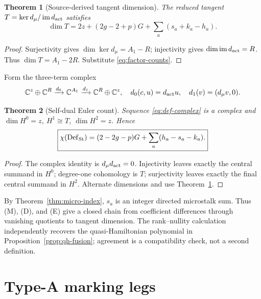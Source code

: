 \documentclass[11pt,a4paper]{amsart}
\theoremstyle{plain}
\newtheorem{theorem}{Theorem}[section]
\theoremstyle{definition}
\newcommand{\CC}{\mathbb C}
\newcommand{\im}{\operatorname{im}}
\newcommand{\Def}{\operatorname{Def}}
\begin{document}
\begin{theorem}[Source-derived tangent dimension]\label{thm:tangent}
The reduced tangent $T=\ker d_\mu/\im d_{\rm act}$ satisfies
\begin{equation}\label{eq:tangent}
 \boxed{\dim T=2z+(2g-2+p)G+\sum_a(s_a+k_a-h_a).}
\end{equation}
\end{theorem}

\begin{proof}
Surjectivity gives $\dim\ker d_\mu=A_1-R$; injectivity gives
$\dim\im d_{\rm act}=R$.  Thus $\dim T=A_1-2R$.  Substitute \eqref{eq:factor-counts}.
\end{proof}

Form the three-term complex
\begin{equation}\label{eq:def-complex}
 \CC^z\oplus\CC^R\xrightarrow{d_0}\CC^{A_1}
 \xrightarrow{d_1}\CC^R\oplus\CC^z,
 \quad d_0(c,u)=d_{\rm act}u,\quad d_1(v)=(d_\mu v,0).
\end{equation}

\begin{theorem}[Self-dual Euler count]\label{thm:euler-count}
Sequence \eqref{eq:def-complex} is a complex and
$\dim H^0=z$, $H^1\cong T$, $\dim H^2=z$.  Hence
\begin{equation}\label{eq:euler-count}
 \boxed{\chi(\Def_{\rm St})=(2-2g-p)G+\sum_a(h_a-s_a-k_a).}
\end{equation}
\end{theorem}

\begin{proof}
The complex identity is $d_\mu d_{\rm act}=0$.  Injectivity leaves exactly the central summand in
$H^0$; degree-one cohomology is $T$; surjectivity leaves exactly the final central summand in
$H^2$.  Alternate dimensions and use Theorem~\ref{thm:tangent}.
\end{proof}

By Theorem~\ref{thm:micro-index}, $s_a$ is an integer directed microstalk sum.  Thus (M), (D), and
(E) give a closed chain from coefficient differences through vanishing quotients to tangent
dimension.  The rank--nullity calculation independently recovers the quasi-Hamiltonian polynomial
in Proposition~\ref{prop:qh-fusion}; agreement is a compatibility check, not a second definition.

\section{Type-A marking legs}\label{sec:legs}
\end{document}
